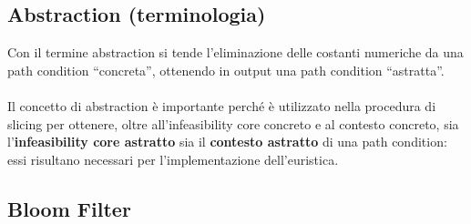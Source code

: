 \documentclass[a4paper, 12pt, oneside]{book}
\newcommand{\qq}[1]{``#1''}
\theoremstyle{normal}
\begin{document}
\subsection{Abstraction (terminologia)}

Con il termine abstraction si tende l'eliminazione delle costanti numeriche da una path condition \qq{concreta}, ottenendo in output una path condition \qq{astratta}. \\ \\ Il concetto di abstraction è importante perché è utilizzato nella procedura di slicing per ottenere, oltre all'infeasibility core concreto e al contesto concreto, sia l'\textbf{infeasibility core astratto} sia il \textbf{contesto astratto} di una path condition: essi risultano necessari per l'implementazione dell'euristica.

\subsection{Bloom Filter}
\end{document}

